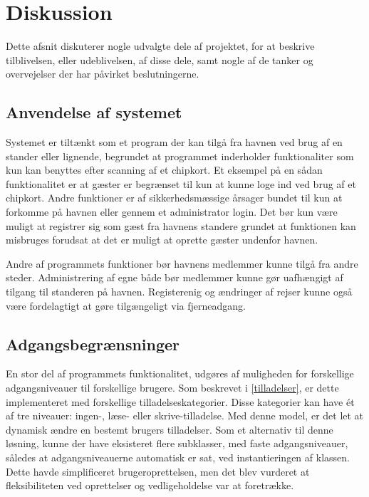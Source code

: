 \chapter{Diskussion}
\label{cha:diskussion}


Dette afsnit diskuterer nogle udvalgte dele af projektet, for at beskrive tilblivelsen, eller udeblivelsen, af disse dele, samt nogle af de tanker og overvejelser der har påvirket beslutningerne.

\section{Anvendelse af systemet} 
\label{sec:anvendelse_af_systemet}
Systemet er tiltænkt som et program der kan tilgå fra havnen ved brug af en stander eller lignende, begrundet at programmet inderholder funktionaliter som kun kan benyttes efter scanning af et chipkort. Et eksempel på en sådan funktionalitet er at gæster er begrænset til kun at kunne loge ind ved brug af et chipkort. Andre funktioner er af sikkerhedsmæssige årsager bundet til kun at forkomme på havnen eller gennem et administrator login. Det bør kun være muligt at registrer sig som gæst fra havnens standere grundet at funktionen kan misbruges forudsat at det er muligt at oprette gæster undenfor havnen. 

Andre af programmets funktioner bør havnens medlemmer kunne tilgå fra andre steder. Administrering af egne både bør medlemmer kunne gør uafhængigt af tilgang til standeren på havnen. Registerenig og ændringer af rejser kunne også være fordelagtigt at gøre tilgængeligt via fjerneadgang. 




\section{Adgangsbegrænsninger}

En stor del af programmets funktionalitet, udgøres af muligheden for forskellige adgangsniveauer til forskellige brugere. Som beskrevet i \cref{tilladelser}, er dette implementeret med forskellige tilladelseskategorier. Disse kategorier kan have ét af tre niveauer: ingen-, læse- eller skrive-tilladelse. Med denne model, er det let at dynamisk ændre en bestemt brugers tilladelser. Som et alternativ til denne løsning, kunne der have eksisteret flere subklasser, med faste adgangsniveauer, således at adgangsniveauerne automatisk er sat, ved instantieringen af klassen. Dette havde simplificeret brugeroprettelsen, men det blev vurderet at fleksibiliteten ved oprettelser og vedligeholdelse var at foretrække.

